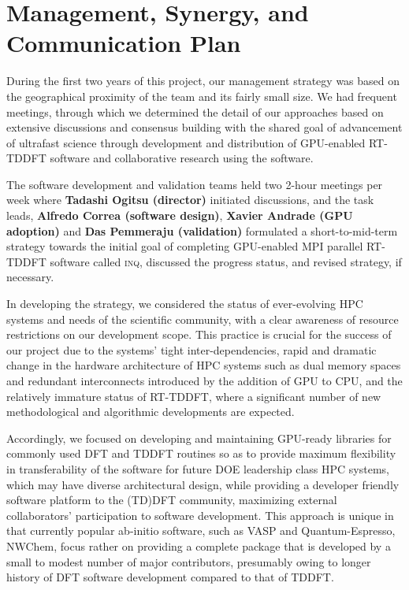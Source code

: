 \section{Management, Synergy, and Communication Plan}
\label{sec:manage}

During the first two years of this project, our management strategy was based on the geographical proximity of the team and its fairly small size. We had frequent meetings, through which we determined the detail of our approaches based on extensive discussions and consensus building with the shared goal of advancement of ultrafast science through development and distribution of GPU-enabled RT-TDDFT software and collaborative research using the software. 

The software development and validation teams held two 2-hour meetings per week where {\bf Tadashi Ogitsu (director)} initiated discussions, and the task leads, {\bf Alfredo Correa (software design)}, {\bf Xavier Andrade (GPU adoption)} and {\bf Das Pemmeraju (validation)} formulated a short-to-mid-term strategy towards the initial goal of completing GPU-enabled MPI parallel RT-TDDFT software called \textsc{inq}, discussed the progress status, and revised strategy, if necessary.

In developing the strategy, we considered the status of ever-evolving HPC systems and needs of the scientific community, with a clear awareness of resource restrictions on our development scope. 
This practice is crucial for the success of our project due to the systems' tight inter-dependencies, rapid and dramatic change in the hardware architecture of HPC systems such as dual memory spaces and redundant interconnects introduced by the addition of GPU to CPU, and the relatively immature status of RT-TDDFT, where a significant number of new methodological and algorithmic developments are expected. 

Accordingly, we focused on developing and maintaining GPU-ready libraries for commonly used DFT and TDDFT routines so as to provide maximum flexibility in transferability of the software for future DOE leadership class HPC systems, which may have diverse architectural design, while providing a developer friendly software platform to the (TD)DFT community, maximizing external collaborators' participation to software development. 
This approach is unique in that currently popular ab-initio software, such as VASP and Quantum-Espresso, NWChem, focus rather on providing a complete package that is developed by a small to modest number of major contributors, presumably owing to longer history of DFT software development compared to that of TDDFT.

